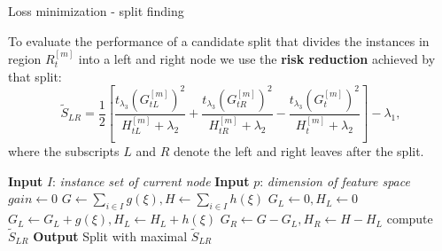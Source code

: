 \begin{vbframe}{Loss minimization - split finding}

    To evaluate the performance of a candidate split that divides the instances in region $R_t^{[m]}$ into a left and right node we use the \textbf{risk reduction} achieved by that split:
    $$
    \tilde S_{LR} =
     \frac12 \left[
     \frac{t_{\lambda_3} \left( G^{[m]}_{tL} \right)^2}{H^{[m]}_{tL} + \lambda_2} + \frac{t_{\lambda_3}\left(G^{[m]}_{tR}\right)^2}{H^{[m]}_{tR} + \lambda_2} - \frac{t_{\lambda_3}\left(G^{[m]}_{t}\right)^2}{H^{[m]}_{t} + \lambda_2}
     \right] - \lambda_1,
    $$
    where the subscripts $L$ and $R$ denote the left and right leaves after the split.


    \lz

    \framebreak

    \begin{algorithm}[H]

    \begin{footnotesize}
    \begin{center}

      \begin{algorithmic}[1]
        \State \textbf{Input} $I$: \emph{instance set of current node}
        \State \textbf{Input} $p$: \emph{dimension of feature space}
        \State $gain \gets 0$
        \State $G \gets \sum_{i \in I} g(\xi), {H} \gets \sum_{i \in I} h(\xi)$
          \State $G_L \gets 0, {H}_L \gets 0$
            \State ${G}_L \gets {G}_L + g(\xi), {H}_L \gets {H}_L + h(\xi)$
            \State ${G}_R \gets G - {G}_L, {H}_R \gets {H} - {H}_L$
            \State compute $\tilde S_{LR}$
          \EndFor
        \EndFor
        \State \textbf{Output} Split with maximal $\tilde S_{LR}$
      \end{algorithmic}
    \end{center}
    \end{footnotesize}
    \caption{(Exact) Algorithm for split finding}
    \end{algorithm}

    \end{vbframe}

    \endlecture

